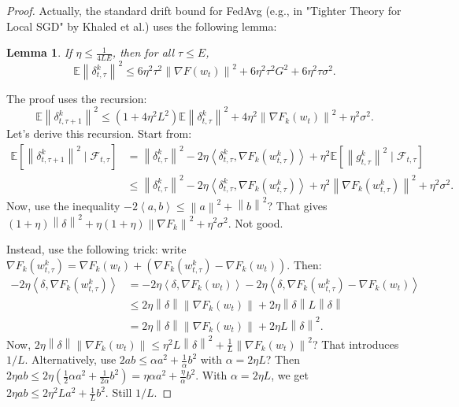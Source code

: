 \documentclass{article}
\newtheorem{lemma}{Lemma}
\newcommand{\norm}[1]{\left\| #1 \right\|}
\newcommand{\inner}[2]{\left\langle #1, #2 \right\rangle}
\begin{document}
\begin{proof}
Actually, the standard drift bound for FedAvg (e.g., in "Tighter Theory for Local SGD" by Khaled et al.) uses the following lemma:
\begin{lemma}
If $\eta \le \frac{1}{4LE}$, then for all $\tau \le E$,
\begin{equation}
    \mathbb{E}\norm{\delta_{t,\tau}^k}^2 \le 6\eta^2 \tau^2 \norm{\nabla F(w_t)}^2 + 6\eta^2 \tau^2 G^2 + 6\eta^2 \tau \sigma^2.
\end{equation}
\end{lemma}
The proof uses the recursion:
\begin{equation}
    \mathbb{E}\norm{\delta_{t,\tau+1}^k}^2 \le (1 + 4\eta^2 L^2) \mathbb{E}\norm{\delta_{t,\tau}^k}^2 + 4\eta^2 \norm{\nabla F_k(w_t)}^2 + \eta^2 \sigma^2.
\end{equation}
Let's derive this recursion. Start from:
\begin{align}
\mathbb{E}[\norm{\delta_{t,\tau+1}^k}^2 \mid \mathcal{F}_{t,\tau}]
&= \norm{\delta_{t,\tau}^k}^2 - 2\eta \inner{\delta_{t,\tau}^k}{\nabla F_k(w_{t,\tau}^k)} + \eta^2 \mathbb{E}[\norm{g_{t,\tau}^k}^2 \mid \mathcal{F}_{t,\tau}] \\
&\le \norm{\delta_{t,\tau}^k}^2 - 2\eta \inner{\delta_{t,\tau}^k}{\nabla F_k(w_{t,\tau}^k)} + \eta^2 \norm{\nabla F_k(w_{t,\tau}^k)}^2 + \eta^2 \sigma^2.
\end{align}
Now, use the inequality $-2\inner{a}{b} \le \norm{a}^2 + \norm{b}^2$? That gives $(1+\eta)\norm{\delta}^2 + \eta(1+\eta)\norm{\nabla F_k}^2 + \eta^2 \sigma^2$. Not good.

Instead, use the following trick: write $\nabla F_k(w_{t,\tau}^k) = \nabla F_k(w_t) + (\nabla F_k(w_{t,\tau}^k) - \nabla F_k(w_t))$. Then:
\begin{align}
-2\eta \inner{\delta}{\nabla F_k(w_{t,\tau}^k)} &= -2\eta \inner{\delta}{\nabla F_k(w_t)} - 2\eta \inner{\delta}{\nabla F_k(w_{t,\tau}^k) - \nabla F_k(w_t)} \\
&\le 2\eta \norm{\delta} \norm{\nabla F_k(w_t)} + 2\eta \norm{\delta} L \norm{\delta} \\
&= 2\eta \norm{\delta} \norm{\nabla F_k(w_t)} + 2\eta L \norm{\delta}^2.
\end{align}
Now, $2\eta \norm{\delta} \norm{\nabla F_k(w_t)} \le \eta^2 L \norm{\delta}^2 + \frac{1}{L} \norm{\nabla F_k(w_t)}^2$? That introduces $1/L$. Alternatively, use $2ab \le \alpha a^2 + \frac{1}{\alpha} b^2$ with $\alpha = 2\eta L$? Then $2\eta ab \le 2\eta (\frac{1}{2} \alpha a^2 + \frac{1}{2\alpha} b^2) = \eta \alpha a^2 + \frac{\eta}{\alpha} b^2$. With $\alpha = 2\eta L$, we get $2\eta ab \le 2\eta^2 L a^2 + \frac{1}{L} b^2$. Still $1/L$.


\end{proof}
\end{document}
